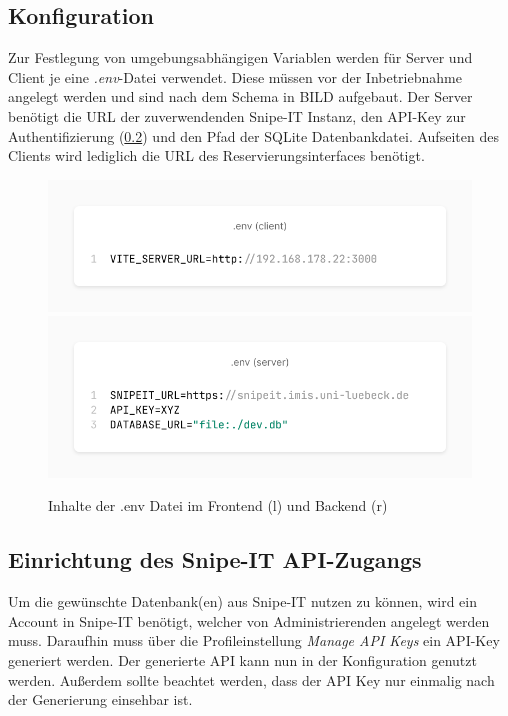 \subsection{Konfiguration}
Zur Festlegung von umgebungsabhängigen Variablen werden für Server und Client je eine
\textit{.env}-Datei verwendet. Diese müssen vor der Inbetriebnahme angelegt werden und sind nach dem
Schema in BILD aufgebaut. Der Server benötigt die URL der zuverwendenden Snipe-IT Instanz, den
API-Key zur Authentifizierung (\ref{section:api}) und den Pfad der SQLite Datenbankdatei.
Aufseiten des Clients wird lediglich die URL des Reservierungsinterfaces benötigt.

\begin{figure}[h]
  \centering
  \includegraphics[scale=0.25]{Bilder/client.png}
  \includegraphics[scale=0.25]{Bilder/sever.png}
  \caption[Inhalte der .env Datei im Frontend (links) und Backend (rechts)]{Inhalte der .env Datei im Frontend (l) und Backend (r)}
  \label{fig:env}
\end{figure}


\subsection{Einrichtung des Snipe-IT API-Zugangs}
\label{section:api}
Um die gewünschte Datenbank(en) aus Snipe-IT nutzen zu können, wird ein Account in Snipe-IT
benötigt, welcher von Administrierenden angelegt werden muss. Daraufhin muss über die
Profileinstellung \textit{Manage API Keys} ein API-Key generiert werden. Der generierte API kann nun
in der Konfiguration genutzt werden. Außerdem sollte beachtet werden, dass der API Key nur einmalig
nach der Generierung einsehbar ist.

